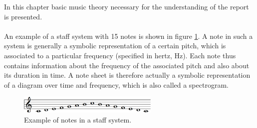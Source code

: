 In this chapter basic music theory necessary for the understanding of the report is presented.
\\ \\
An example of a staff system with 15 notes is shown in figure \ref{fig:cmajor}. A note in such a system is generally a symbolic representation of a certain pitch, which is associated to a particular frequency (specified in hertz, Hz). Each note thus contains information about the frequency of the associated pitch and also about its duration in time. A note sheet is therefore actually a symbolic representation of a diagram over time and frequency, which is also called a spectrogram.

\begin{figure}[H]
    \centering
    \includegraphics[width = 0.6\textwidth]{figures/Cmajor.png}
    \caption{Example of notes in a staff system.}
    \label{fig:cmajor}
\end{figure}

